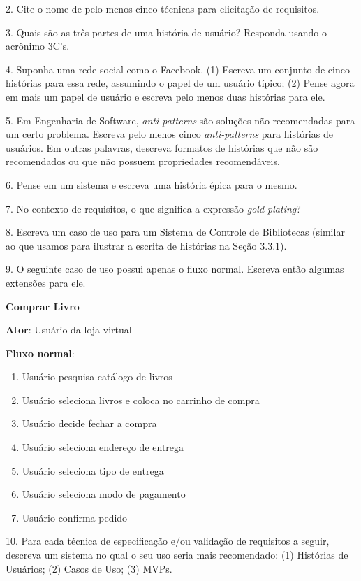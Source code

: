 \documentclass[
  11pt,
  twoside]{book}
\renewenvironment{quote}{\centering \vspace{1.5ex} \begin{tcolorbox}[colback=backcolor, width=4.9in]}{\end{tcolorbox}}
\begin{document}
2. Cite o nome de pelo menos cinco técnicas para elicitação de
requisitos.

3. Quais são as três partes de uma história de usuário? Responda usando
o acrônimo 3C's.

4. Suponha uma rede social como o Facebook. (1) Escreva um conjunto de
cinco histórias para essa rede, assumindo o papel de um usuário típico;
(2) Pense agora em mais um papel de usuário e escreva pelo menos duas
histórias para ele.

5. Em Engenharia de Software, \emph{anti-patterns} são soluções não
recomendadas para um certo problema. Escreva pelo menos cinco
\emph{anti-patterns} para histórias de usuários. Em outras palavras,
descreva formatos de histórias que não são recomendados ou que não
possuem propriedades recomendáveis.

6. Pense em um sistema e escreva uma história épica para o mesmo.

7. No contexto de requisitos, o que significa a expressão \emph{gold
plating}?

8. Escreva um caso de uso para um Sistema de Controle de Bibliotecas
(similar ao que usamos para ilustrar a escrita de histórias na Seção
3.3.1).

9. O seguinte caso de uso possui apenas o fluxo normal. Escreva então
algumas extensões para ele.

\begin{quote}
\textbf{Comprar Livro}

\textbf{Ator}: Usuário da loja virtual

\textbf{Fluxo normal}:

\begin{enumerate}
\def\labelenumi{\arabic{enumi}.}
\item
  Usuário pesquisa catálogo de livros
\item
  Usuário seleciona livros e coloca no carrinho de compra
\item
  Usuário decide fechar a compra
\item
  Usuário seleciona endereço de entrega
\item
  Usuário seleciona tipo de entrega
\item
  Usuário seleciona modo de pagamento
\item
  Usuário confirma pedido
\end{enumerate}
\end{quote}

10. Para cada técnica de especificação e/ou validação de requisitos a
seguir, descreva um sistema no qual o seu uso seria mais recomendado:
(1) Histórias de Usuários; (2) Casos de Uso; (3) MVPs.
\end{document}
